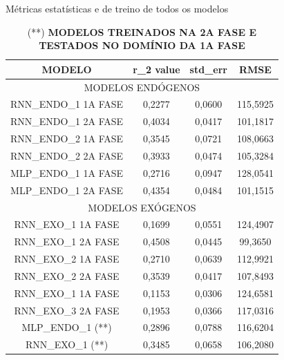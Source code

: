 	    \begin{table}[!ht]
        \caption{Métricas estatísticas e de treino de todos os modelos}
        \begin{adjustbox}{width=0.8\columnwidth,center}
           \begin{tabular}{ |c | c| c | c| }
     \rowcolor{gray!50}
   {	MODELO} & r\_2 value &	std\_err & RMSE \\ \hline
     \multicolumn{4}{c}{	MODELOS ENDÓGENOS }  \\ \hline
RNN\_ENDO\_1 1A FASE&	0,2277	&0,0600&	115,5925\\ \hline
RNN\_ENDO\_1 2A FASE&	0,4034	&0,0417&	101,1817\\ \hline
RNN\_ENDO\_2 1A FASE&	0,3545	&0,0721&	108,0663\\ \hline
RNN\_ENDO\_2 2A FASE&	0,3933	&0,0474&	105,3284\\ \hline
MLP\_ENDO\_1 1A FASE&	0,2716	&0,0947&	128,0541\\ \hline
MLP\_ENDO\_1 2A FASE&	0,4354	&0,0484&	101,1515\\ \hline
	\multicolumn{4}{c}{ MODELOS EXÓGENOS }\\ \hline
RNN\_EXO\_1 1A FASE &	0,1699 &		0,0551 &		124,4907\\ \hline
RNN\_EXO\_1 2A FASE &	0,4508 &		0,0445 &		 99,3650\\ \hline
RNN\_EXO\_2 1A FASE &	0,2710 &		0,0639 &		112,9921\\ \hline
RNN\_EXO\_2 2A FASE &	0,3539 &		0,0417 &		107,8493\\ \hline
RNN\_EXO\_1 1A FASE &	0,1153 &		0,0306 &		124,6581\\ \hline
RNN\_EXO\_3 2A FASE &	0,1953 &		0,0366 &		117,0316\\ \hline
MLP\_ENDO\_1 (**)   &   0,2896 &		0,0788 &		116,6204\\ \hline
RNN\_EXO\_1  (**)   &	0,3485 &		0,0658 &		106,2080\\ \hline
\end{tabular} \end{adjustbox}\caption*{(**) \textbf{MODELOS TREINADOS NA 2A FASE E TESTADOS NO DOMÍNIO DA 1A FASE}} \end{table} 
	    
